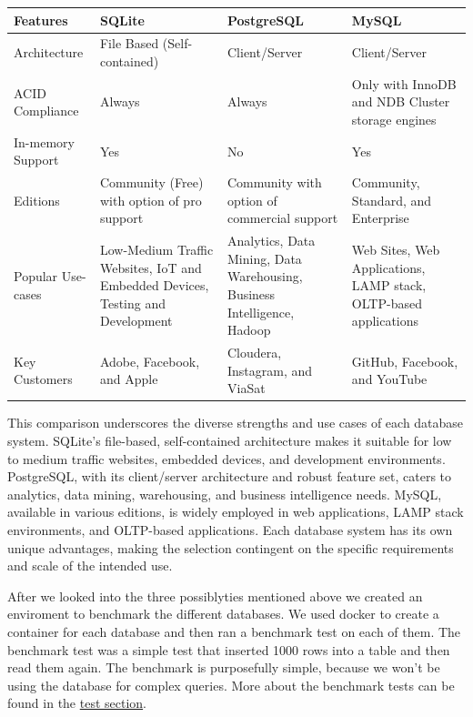 \begin{center}
    \begin{tabular}{ | m{3cm} | m{4cm}| m{4cm} | m{4cm} | } 
      \hline
      Features & SQLite & PostgreSQL & MySQL \\ 
      \hline
      Architecture & File Based (Self-contained) & Client/Server & Client/Server \\ 
      \hline
      ACID Compliance & Always & Always & Only with InnoDB and NDB Cluster storage engines \\ 
      \hline
      In-memory Support & Yes & No & Yes \\
      \hline
      Editions & Community (Free) with option of pro support & Community with option of commercial support & Community, Standard, and Enterprise \\
      \hline
      Popular Use-cases & Low-Medium Traffic Websites, IoT and Embedded Devices, Testing and Development & Analytics, Data Mining, Data Warehousing, Business Intelligence, Hadoop & Web Sites, Web Applications, LAMP stack, OLTP-based applications \\
      \hline
      Key Customers & Adobe, Facebook, and Apple & Cloudera, Instagram, and ViaSat & GitHub, Facebook, and YouTube \\
      \hline
    \end{tabular}
\end{center}

This comparison underscores the diverse strengths and use cases of each database system. SQLite's file-based, self-contained architecture makes it suitable for 
low to medium traffic websites, embedded devices, and development environments. PostgreSQL, with its client/server architecture and robust feature set, caters 
to analytics, data mining, warehousing, and business intelligence needs. MySQL, available in various editions, is widely employed in web applications, LAMP 
stack environments, and OLTP-based applications. Each database system has its own unique advantages, making the selection contingent on the specific 
requirements and scale of the intended use.\newline

After we looked into the three possiblyties mentioned above we created an enviroment to benchmark the different databases. We used docker to create a container for each 
database and then ran a benchmark test on each of them. The benchmark test was a simple test that inserted 1000 rows into a table and then read them again. The benchmark is
purposefully simple, because we won't be using the database for complex queries. More about the benchmark tests can be found in the \href{tests.tex}{test section}.

